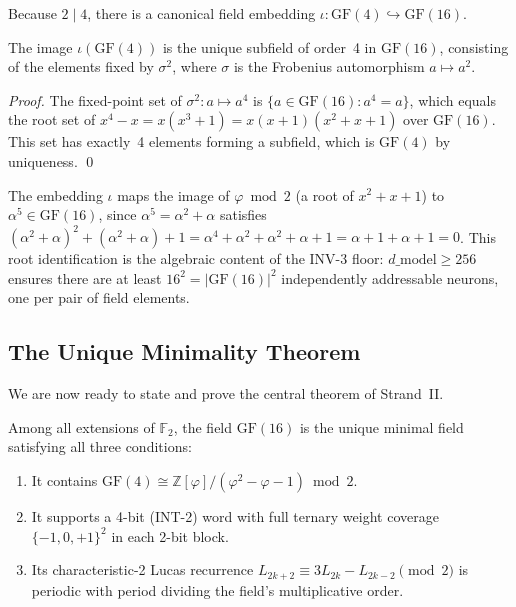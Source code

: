 Because \(2 \mid 4\), there is a canonical field embedding
\(\iota\colon\mathrm{GF}(4)\hookrightarrow\mathrm{GF}(16)\).

\begin{proposition}
The image \(\iota(\mathrm{GF}(4))\) is the unique subfield of order~4 in
\(\mathrm{GF}(16)\), consisting of the elements fixed by \(\sigma^2\),
where \(\sigma\) is the Frobenius automorphism \(a\mapsto a^2\).
\end{proposition}

\begin{proof}
The fixed-point set of \(\sigma^2\colon a\mapsto a^4\) is
\(\{a\in\mathrm{GF}(16):a^4=a\}\),
which equals the root set of \(x^4-x=x(x^3+1)=x(x+1)(x^2+x+1)\) over
\(\mathrm{GF}(16)\).
This set has exactly~4 elements forming a subfield,
which is \(\mathrm{GF}(4)\) by uniqueness.
\qed
\end{proof}

\begin{remark}
The embedding \(\iota\) maps the image of \(\varphi\bmod 2\) (a root of
\(x^2+x+1\)) to \(\alpha^5\in\mathrm{GF}(16)\), since
\(\alpha^5 = \alpha^2+\alpha\) satisfies
\((\alpha^2+\alpha)^2+(\alpha^2+\alpha)+1
  = \alpha^4+\alpha^2+\alpha^2+\alpha+1
  = \alpha+1+\alpha+1
  = 0\).
This root identification is the algebraic content of the INV-3 floor:
\(d\_\mathrm{model}\geq 256\) ensures there are at least
\(16^2 = |\mathrm{GF}(16)|^2\) independently addressable neurons,
one per pair of field elements.
\end{remark}

\subsection{The Unique Minimality Theorem}
\label{sec:gf16-phi-unique}

We are now ready to state and prove the central theorem of Strand~II.

\begin{theorem}
\label{thm:gf16-unique-minimal}
Among all extensions of \(\mathbb{F}_2\), the field \(\mathrm{GF}(16)\)
is the unique minimal field satisfying all three conditions:
\begin{enumerate}
  \item[(C1)] It contains \(\mathrm{GF}(4) \cong \mathbb{Z}[\varphi]/(\varphi^{2}-\varphi-1)\bmod 2\).
  \item[(C2)] It supports a 4-bit (INT-2) word with full ternary weight coverage
              \(\{-1,0,+1\}^2\) in each 2-bit block.
  \item[(C3)] Its characteristic-2 Lucas recurrence
              \(L_{2k+2}\equiv 3L_{2k}-L_{2k-2}\pmod{2}\)
              is periodic with period dividing the field's multiplicative order.
\end{enumerate}
\end{theorem}

